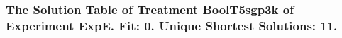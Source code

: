  \begin{frame}
 \fontsize{8pt}{9pt}\selectfont
 \frametitle{ The Solution Table of Treatment BoolT5sgp3k of Experiment ExpE. Fit: 0. Unique Shortest Solutions: 11. }

 \label{ExpESolutionTable006.tex}  
 \end{frame}

